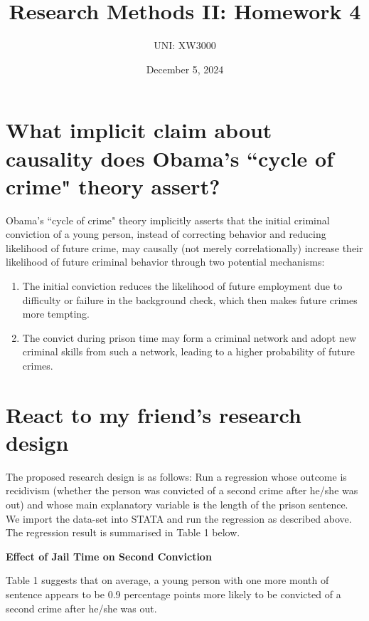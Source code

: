 \documentclass[12pt]{article}
\title{Research Methods II: Homework 4}
\author{UNI: XW3000}
\date{December 5, 2024}
\begin{document}
\maketitle

\section{What implicit claim about causality does Obama's ``cycle of crime" theory assert? 
}

Obama's ``cycle of crime" theory implicitly asserts that the initial criminal conviction of a young person, instead of correcting behavior and reducing likelihood of future crime, may causally (not merely correlationally) increase their likelihood of future criminal behavior through two potential mechanisms:

\begin{enumerate}
    \item The initial conviction reduces the likelihood of future employment due to difficulty or failure in the background check, which then makes future crimes more tempting.
    \item The convict during prison time may form a criminal network and adopt new criminal skills from such a network, leading to a higher probability of future crimes. 
\end{enumerate}

\section{React to my friend's research design}

The proposed research design is as follows: Run a regression whose outcome is recidivism (whether the person was convicted of a second crime after he/she was out) and whose main explanatory variable is the length of the prison sentence. \\

We import the data-set into STATA and run the regression as described above. The regression result is summarised in Table 1 below.

\begin{table}[H]
    \begin{center} 
    \caption{\textbf{Effect of Jail Time on Second Conviction}}
    \label{tab:balance}
    
    \end{center}
\end{table}

Table 1 suggests that on average, a young person with one more month of sentence appears to be 0.9 percentage points more likely to be convicted of a second crime after he/she was out. \\
\end{document}
